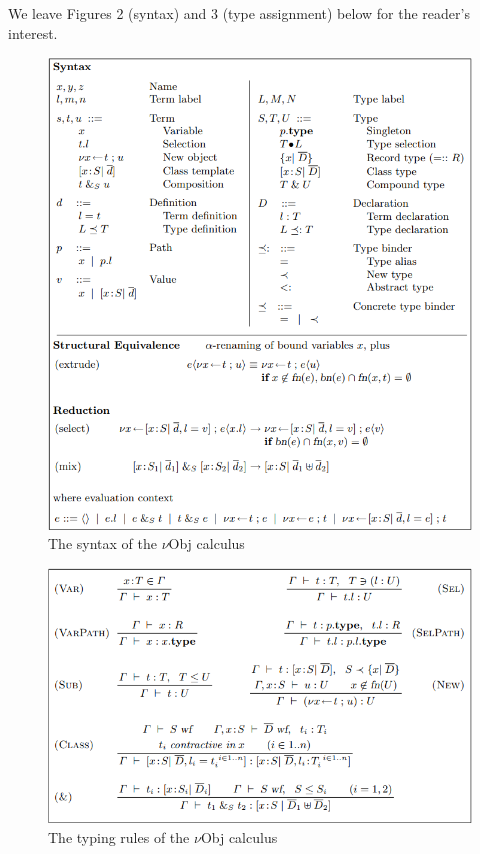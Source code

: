 \documentclass[jou,apacite]{IEEEtran}
\begin{document}
  We leave Figures 2 (syntax) and 3 (type assignment) below for the reader's interest.
  \begin{figure}[h]
    \centering
    \includegraphics[width=\columnwidth]{syntax.png}
    \caption{The syntax of the $\nu$Obj calculus}
    \label{fig:example}
  \end{figure}

  \begin{figure}[h]
    \centering
    \includegraphics[width=\columnwidth]{typecheck.png}
    \caption{The typing rules of the $\nu$Obj calculus}
    \label{fig:example}
  \end{figure}
\end{document}
